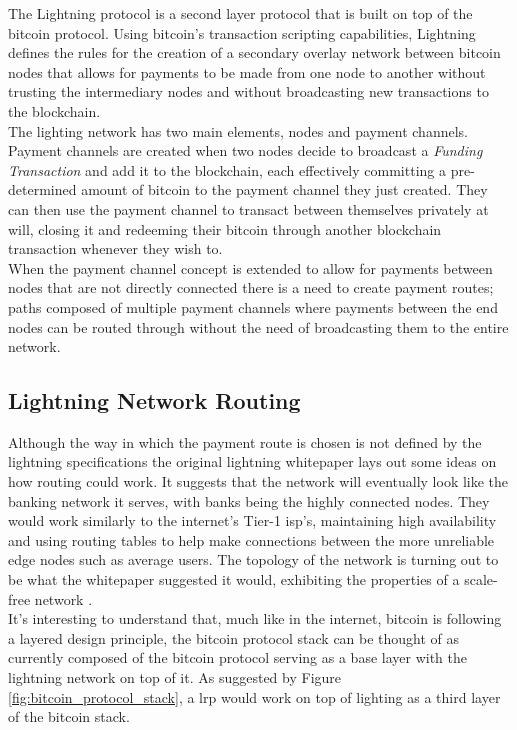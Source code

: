 The Lightning protocol \cite{lightning_network} is a second layer protocol that is built on top of the bitcoin protocol. Using bitcoin's transaction scripting capabilities, Lightning defines the rules for the creation of a secondary overlay network between bitcoin nodes that allows for payments to be made from one node to another without trusting the intermediary nodes and without broadcasting new transactions to the blockchain. \\
The lighting network has two main elements, nodes and payment channels. Payment channels are created when two nodes decide to broadcast a \textit{Funding Transaction} and add it to the blockchain, each effectively committing a pre-determined amount of bitcoin to the payment channel they just created. They can then use the payment channel to transact between themselves privately at will, closing it and redeeming their bitcoin through another blockchain transaction whenever they wish to. \\
When the payment channel concept is extended to allow for payments between nodes that are not directly connected there is a need to create payment routes; paths composed of multiple payment channels where payments between the end nodes can be routed through without the need of broadcasting them to the entire network.

\subsection{Lightning Network Routing}
\label{ssec:lightning_network_routing}

Although the way in which the payment route is chosen is not defined by the lightning specifications \cite{lightning_network_specs} the original lightning whitepaper \cite{lightning_network} lays out some ideas on how routing could work. It suggests that the network will eventually look like the banking network it serves, with banks being the highly connected nodes. They would work similarly to the internet's Tier-1 \acrshort{isp}'s, maintaining high availability and using routing tables to help make connections between the more unreliable edge nodes such as average users. The topology of the network is turning out to be what the whitepaper suggested it would, exhibiting the properties of a scale-free network \cite{ln_analysis} \cite{network_science}. \\
It's interesting to understand that, much like in the internet, bitcoin is following a layered design principle, the bitcoin protocol stack can be thought of as currently composed of the bitcoin protocol serving as a base layer with the lightning network on top of it. As suggested by Figure \ref{fig:bitcoin_protocol_stack}, a \acrfull{lrp} would work on top of lighting as a third layer of the bitcoin stack.

